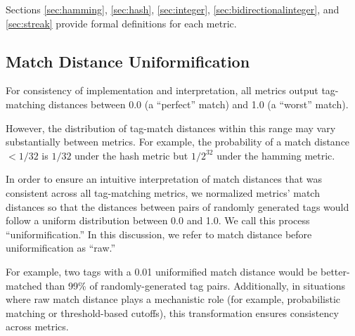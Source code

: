 


Sections \ref{sec:hamming}, \ref{sec:hash}, \ref{sec:integer}, \ref{sec:bidirectionalinteger}, and \ref{sec:streak} provide formal definitions for each metric.







\subsection{Match Distance Uniformification}
\label{sec:uniformification}

For consistency of implementation and interpretation, all metrics output tag-matching distances between 0.0 (a ``perfect'' match) and 1.0 (a ``worst'' match).

However, the distribution of tag-match distances within this range may vary substantially between metrics.
For example, the probability of a match distance $<1/32$ is $1/32$ under the hash metric but $1/2^{32}$ under the hamming metric.

In order to ensure an intuitive interpretation of match distances that was consistent across all tag-matching metrics, we normalized metrics' match distances so that the distances between pairs of randomly generated tags would follow a uniform distribution between 0.0 and 1.0.
We call this process ``uniformification.''
In this discussion, we refer to match distance before uniformification as ``raw.''

For example, two tags with a 0.01 uniformified match distance would be better-matched than 99\% of randomly-generated tag pairs.
Additionally, in situations where raw match distance plays a mechanistic role (for example, probabilistic matching or threshold-based cutoffs), this transformation ensures consistency across metrics.

